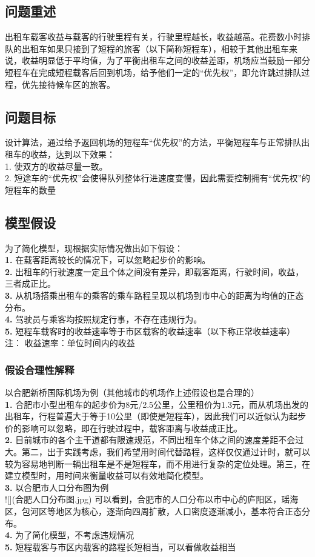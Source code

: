 \documentclass[UTF8]{ctexart}
\begin{document}
	\subsection{问题重述}
	出租车载客收益与载客的行驶里程有关，行驶里程越长，收益越高。花费数小时排队的出租车如果只接到了短程的旅客（以下简称短程车），相较于其他出租车来说，收益明显低于平均值，为了平衡出租车之间的收益差距，机场应当鼓励一部分短程车在完成短程载客后回到机场，给予他们一定的“优先权”，即允许跳过排队过程，优先接待候车区的旅客。
	
	\subsection{问题目标}
	设计算法，通过给予返回机场的短程车“优先权”的方法，平衡短程车与正常排队出租车的收益，达到以下效果：\\
	1. 使双方的收益尽量一致。\\
	2. 短途车的“优先权”会使得队列整体行进速度变慢，因此需要控制拥有“优先权”的短程车的数量\\
	
	\subsection{模型假设}
	为了简化模型，现根据实际情况做出如下假设：\\
	\textbf{1.} 在载客距离较长的情况下，可以忽略起步价的影响。\\
	\textbf{2.} 出租车的行驶速度一定且个体之间没有差异，即载客距离，行驶时间，收益，三者成正比。\\
	\textbf{3.} 从机场搭乘出租车的乘客的乘车路程呈现以机场到市中心的距离为均值的正态分布。\\
	\textbf{4.} 驾驶员与乘客均按照规定行事，不存在违规行为。\\
	\textbf{5.} 短程车载客时的收益速率等于市区载客的收益速率（以下称正常收益速率）\\
	注： 收益速率：单位时间内的收益
	\subsubsection{假设合理性解释}
	以合肥新桥国际机场为例（其他城市的机场作上述假设也是合理的）\\
	\textbf{1.} 合肥市小型出租车的起步价为8元/2.5公里，公里租价为1.3元，而从机场出发的出租车，行程普遍大于等于10公里（即使是短程车），因此我们可以近似认为起步价的影响可以忽略，即在行驶过程中，载客距离与收益成正比。\\
	\textbf{2.} 目前城市的各个主干道都有限速规范，不同出租车个体之间的速度差距不会过大。第二，出于实践考虑，我们希望用时间代替路程，这样仅仅通过计时，就可以较为容易地判断一辆出租车是不是短程车，而不用进行复杂的定位处理。第三，在建立模型时，用时间来衡量收益可以有效地简化模型。\\
	\textbf{3.} 以合肥市人口分布图为例\\
	![](合肥人口分布图.jpg)
	可以看到，合肥市的人口分布以市中心的庐阳区，瑶海区，包河区等地区为核心，逐渐向四周扩散，人口密度逐渐减小，基本符合正态分布。\\
	\textbf{4.} 为了简化模型，不考虑违规情况 \\
	\textbf{5.} 短程载客与市区内载客的路程长短相当，可以看做收益相当 \\
		
\end{document}
